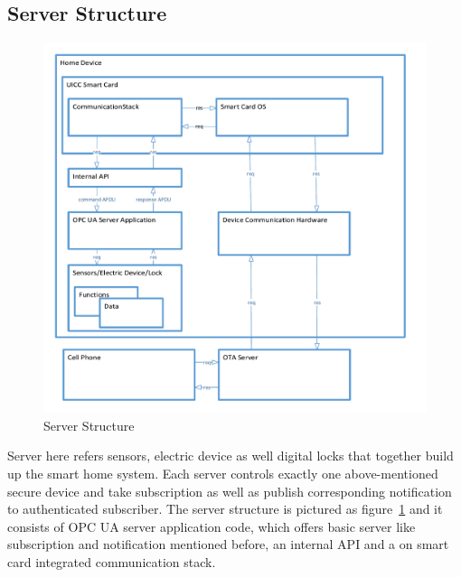 \subsection{Server Structure}

\begin{figure}
	\centering
	\includegraphics[width=1.2\textwidth]{serverStructure}
		\caption{Server Structure}
	\label{fig:serverStructure}
\end{figure}
Server here refers sensors, electric device as well digital locks that together build up the smart home system. Each server controls exactly one above-mentioned secure device and take subscription as well as publish corresponding notification to authenticated subscriber. The server structure is pictured as figure~\ref{fig:serverStructure} and it consists of OPC UA server application code, which offers basic server like subscription and notification mentioned before, an internal API and a on smart card integrated communication stack.

